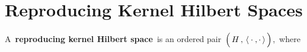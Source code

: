 
\section{Reproducing Kernel Hilbert Spaces}
\setcounter{theorem}{0}

\renewcommand{\theenumi}{\roman{enumi}}
\renewcommand{\labelenumi}{\textnormal{(\theenumi)}$\;\;$}


\begin{definition}
\mbox{}
\vskip 0.1cm
\noindent
A \,\textbf{reproducing kernel Hilbert space}\, is an ordered pair
\,$\left(\,H\,,\,\langle\,\overset{{\color{white}1}}{\cdot}\,,\cdot\,\rangle\,\right)$,\,
where


\end{definition}
